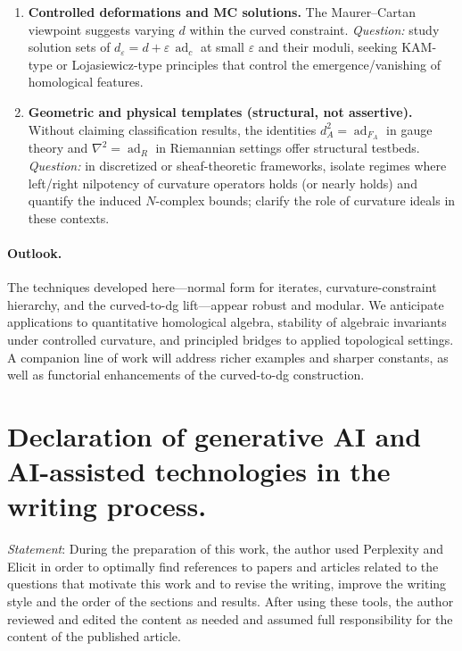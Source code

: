 \documentclass[preprint,12pt]{elsarticle}
\newcommand{\ad}{\operatorname{ad}}
\begin{document}
\begin{enumerate}
\item \textbf{Controlled deformations and MC solutions.}
The Maurer–Cartan viewpoint suggests varying $d$ within the curved constraint.
\emph{Question:} study solution sets of $d_\varepsilon=d+\varepsilon\,\ad_c$ at small $\varepsilon$
and their moduli, seeking KAM-type or Lojasiewicz-type principles that control
the emergence/vanishing of homological features.

\item \textbf{Geometric and physical templates (structural, not assertive).}
Without claiming classification results, the identities $d_A^2=\ad_{F_A}$ in gauge theory
and $\nabla^2=\ad_R$ in Riemannian settings offer structural testbeds.
\emph{Question:} in discretized or sheaf-theoretic frameworks, isolate regimes where
left/right nilpotency of curvature operators holds (or nearly holds) and quantify the induced
$N$-complex bounds; clarify the role of curvature ideals in these contexts.

\end{enumerate}

\paragraph{Outlook.}
The techniques developed here---normal form for iterates, curvature-constraint hierarchy,
and the curved-to-dg lift---appear robust and modular. We anticipate applications to
quantitative homological algebra, stability of algebraic invariants under controlled curvature,
and principled bridges to applied topological settings. A companion line of work will address
richer examples and sharper constants, as well as functorial enhancements of the curved-to-dg construction.

\section{Declaration of generative AI and AI-assisted technologies in the writing process.}

{\it Statement}: During the preparation of this work, the author used Perplexity and Elicit in order to optimally find references to papers and articles related to the questions that motivate this work and to revise the writing, improve the writing style and the order of the sections and results. After using these tools, the author reviewed and edited the content as needed and assumed full responsibility for the content of the published article.









\end{document}
